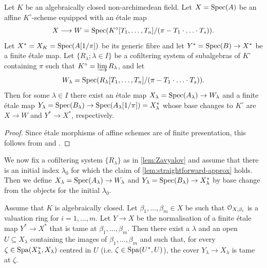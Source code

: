 \begin{lem}  
\label{lem:straightforward-approx}
    Let $K$ be an algebraically closed non-archimedean field. Let $X=\operatorname{Spec}(A)$ be an affine $K^\circ$-scheme equipped with an \'etale map
    \[ 
        X\longrightarrow W = \operatorname{Spec}(K^\circ[T_1, \dots, T_n]/(\pi- T_1\cdot\ldots\cdot T_s)).
    \]
    Let $X^* = X_K = \operatorname{Spec}(A[1/\pi])$ be its generic fibre and let $Y^*=\operatorname{Spec}(B)\to X^*$ be a finite \'etale map. Let $\{R_\lambda; \lambda \in I\}$ be a cofiltering system of subalgebras of $K^\circ$ containing $\pi$ such that $K^\circ=\varinjlim R_\lambda$, 
    and let
    \[
        W_\lambda = \operatorname{Spec}(R_\lambda[T_1, \dots, T_n]/(\pi- T_1\cdot\ldots\cdot T_s)).
    \]
    Then for some $\lambda\in I$ there exist an \'etale map $X_\lambda=\operatorname{Spec}(A_\lambda)\to W_\lambda$ and a finite \'etale map $Y_\lambda=\operatorname{Spec}(B_\lambda)\to \operatorname{Spec}(A_\lambda[1/\pi]) = X^*_\lambda$ whose base changes to $K^\circ$ are $X\to W$ and $Y^*\to X^*$, respectively.
\end{lem}

\begin{proof}
Since \'etale morphisms of affine schemes are of finite presentation, this follows from \cite[8.8.2 and 8.10.5(viii,x)]{EGAIV3} and .
\end{proof}

We now fix a cofiltering system $\{R_\lambda\}$ as in \cref{lem:Zavyalov} and assume that there is an initial index $\lambda_0$ for which the claim of \cref{lem:straightforward-approx} holds. Then we define $X_\lambda = \operatorname{Spec}(A_\lambda) \to W_\lambda$ and $Y_\lambda = \operatorname{Spec}(B_\lambda) \to X_\lambda^*$ by base change from the objects for the initial $\lambda_0$. 

\begin{lem}
\label{lem:locus of tameness}
     Assume that $K$ is algebraically closed. 
Let $\beta_1, \ldots, \beta_m \in X$ be such that ${\mathcal O}_{X,\beta_i}$ is a valuation ring for $i =1, \ldots, m$. Let $Y \to X$ be the normalisation of a finite \'etale map $Y^* \to X^*$ that is tame at $\beta_1, \ldots, \beta_m$. Then there exist a $\lambda$ and an open $U \subseteq X_\lambda$ containing the images of $\beta_1, \ldots, \beta_m$ and such that, for every $\zeta \in \operatorname{Spa}(X_\lambda^*, X_\lambda)$ centred in $U$ (i.e. $\zeta \in \operatorname{Spa}(U^*,U)$), the cover $Y_\lambda \to X_\lambda$ is tame at $\zeta$. 
\end{lem}


